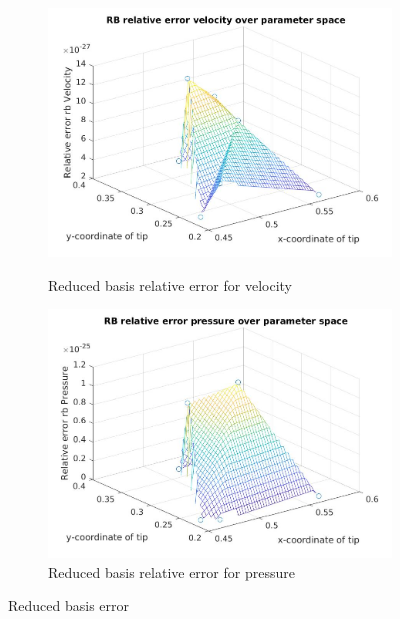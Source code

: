 \documentclass[a4paper,oneside,openright,spanish,english]{book}
\begin{document}
\begin{figure}
\begin{subfigure}{\textwidth}	
  \includegraphics[width=\linewidth]{same_train_test/rb_error_velocity.jpg}
  \caption{Reduced basis relative error for velocity} 
  \label{rb_error_velocity_2}
  \includegraphics[width=\linewidth]{same_train_test/rb_error_pressure.jpg}
  \caption{Reduced basis relative error for pressure} 
  \label{rb_error_pressure_2}
\end{subfigure}
\caption{Reduced basis error}
\label{rb_error_2}
\end{figure}
\end{document}
